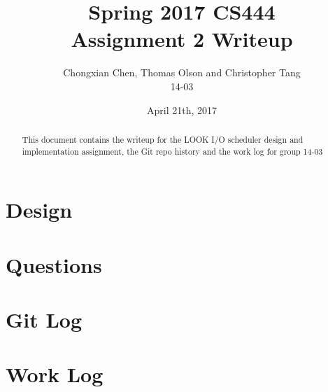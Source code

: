\documentclass[10pt,onecolumn,journal,draftclsnofoot,letterpaper]{IEEEtran}
\begin{document}
\begin{titlepage}
  \title{Spring 2017 CS444\\Assignment 2 Writeup}
  \author{Chongxian Chen, Thomas Olson and Christopher Tang\\14-03}
  \date{April 21th, 2017}
  \maketitle
  \vspace{4cm}
  \begin{abstract}
  \noindent This document contains the writeup for the LOOK I/O scheduler design and implementation assignment, the Git repo history and the work log for group 14-03
 \end{abstract}
    \bigskip
    \bigskip
    \bigskip
    \bigskip
    \bigskip

\end{titlepage}

\section{Design}

\section{Questions}

\subsection{}

\subsection{}

\subsection{}

\subsection{}

\section{Git Log}

\section{Work Log}
\end{document}
